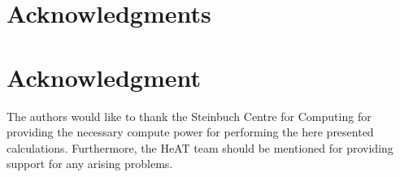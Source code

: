 
\ifCLASSOPTIONcompsoc
  \section*{Acknowledgments}
\else
  \section*{Acknowledgment}
\fi
The authors would like to thank the Steinbuch Centre for Computing for providing the necessary compute power for 
performing the here presented calculations.
Furthermore, the HeAT team should be mentioned for providing support for any arising problems.